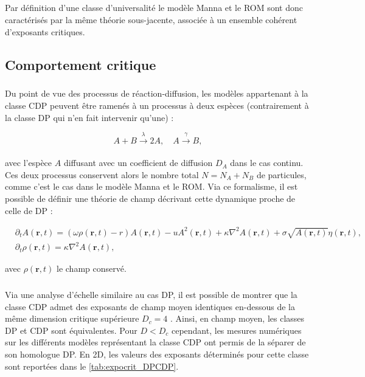 \subparagraph{}Par définition d'une classe d'universalité le modèle Manna et le ROM sont donc caractérisés par la même théorie sous-jacente, associée à un ensemble cohérent d'exposants critiques.

\subsection{Comportement critique}

\label{sec:CompCDP}

\subparagraph{}Du point de vue des processus de réaction-diffusion, les modèles appartenant à la classe CDP peuvent être ramenés à un processus à deux espèces \cite{van_wijland_wilson_1998, pastor_satorras_reaction_diffusion_2001, pastor_satorras_field_2000} (contrairement à la classe DP qui n'en fait intervenir qu'une) :

\begin{equation}
	A +B \xrightarrow[]{\lambda} 2A, \quad A \xrightarrow[]{\gamma} B,
\end{equation}

\noindent avec l'espèce $A$ diffusant avec un coefficient de diffusion $D_A$ dans le cas continu. Ces deux processus conservent alors le nombre total $N=N_A+N_B$ de particules, comme c'est le cas dans le modèle Manna et le ROM. Via ce formalisme, il est possible de définir une théorie de champ décrivant cette dynamique proche de celle de DP \cite{van_wijland_universality_2002, le_doussal_exact_2015} :

\begin{equation}
\begin{aligned}
	&\partial_t A(\mathbf{r}, t) = (\omega\rho (\mathbf{r}, t) - r)A(\mathbf{r}, t) - uA^2(\mathbf{r}, t) + \kappa\nabla^2 A (\mathbf{r}, t) + \sigma \sqrt{A(\mathbf{r}, t)} \eta(\mathbf{r}, t),\\
	&\partial_t \rho (\mathbf{r}, t) = \kappa\nabla^2 A (\mathbf{r}, t),
\end{aligned}
\label{eq:CDP}
\end{equation}

\noindent avec $\rho(\mathbf{r}, t)$ le champ conservé.

\subparagraph{}Via une analyse d'échelle similaire au cas DP, il est possible de montrer que la classe CDP admet des exposants de champ moyen identiques en-dessous de la même dimension critique supérieure $D_c = 4$ \cite{le_doussal_exact_2015, lubeck_universal_2004}. Ainsi, en champ moyen, les classes DP et CDP sont équivalentes. Pour $D<D_c$ cependant, les mesures numériques sur les différents modèles représentant la classe CDP ont permis de la séparer de son homologue DP. En 2D, les valeurs des exposants déterminés pour cette classe sont reportées dans le \autoref{tab:expocrit_DPCDP}.

